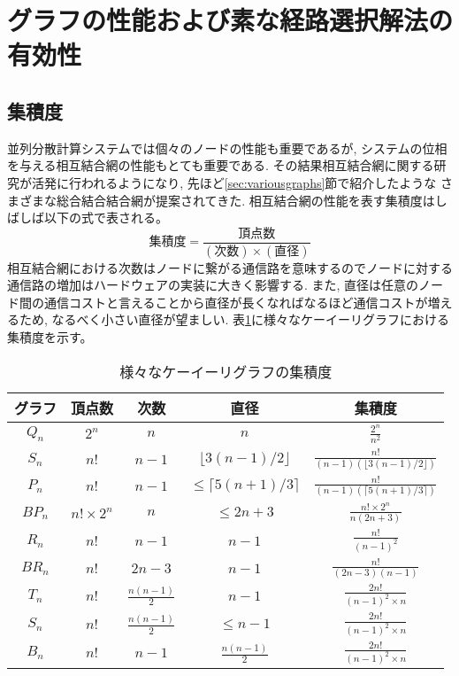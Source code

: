\documentclass[specialreport]{subfiles}
\begin{document}
\section{グラフの性能および素な経路選択解法の有効性}
\subsection{集積度}
並列分散計算システムでは個々のノードの性能も重要であるが, システムの位相を与える相互結合網の性能もとても重要である.
その結果相互結合網に関する研究が活発に行われるようになり, 先ほど\ref{sec:variousgraphs}節で紹介したような
さまざまな総合結合結合網が提案されてきた. 相互結合網の性能を表す集積度はしばしば以下の式で表される。
\[集積度 = \frac{頂点数}{(次数) \times (直径)} \]
相互結合網における次数はノードに繋がる通信路を意味するのでノードに対する通信路の増加はハードウェアの実装に大きく影響する.
また, 直径は任意のノード間の通信コストと言えることから直径が長くなればなるほど通信コストが増えるため, なるべく小さい直径が望ましい.
表\ref{tab:intergrationratio}に様々なケーイーリグラフにおける集積度を示す。
\begin{table}[htb]
  \begin{center}
    \caption{様々なケーイーリグラフの集積度}
    \begin{tabular}{|c|c|c|c|c|} \hline
      グラフ&頂点数&次数&直径&集積度 \\ \hline 
      $Q_n$&$2^n$ & $n$&$n$&$ \frac{2^n}{n^2} $ \\ \hline
      $S_n$&$n!$ & $n-1$&$\lfloor3(n - 1) /2 \rfloor$& $\frac{n! }{(n-1)(\lfloor3(n - 1) /2 \rfloor)}$ \\ \hline
      $P_n$&$n!$ & $n-1$& $ \leq \lceil 5(n + 1) /3 \rceil$ & $\frac{n!}{(n-1)(\lceil 5(n + 1) /3 \rceil)}$\\ \hline  
      $BP_n$&$n!\times 2^{n}$ & $n$& $ \leq  2n + 3 $ & $\frac{n!\times 2^{n}}{n( 2n + 3)}$\\ \hline 
      $R_n$&$n!$ & $n-1$&$n-1$& $ \frac {n!}{(n-1)^2} $\\ \hline
      $BR_n$&$n!$ & $2n-3$&$n-1$& $ \frac {n!}{(2n-3)(n-1)} $\\ \hline
      $T_n$&$n!$ & $\frac{n(n-1)}{2}$&$n-1$& $ \frac {2n!}{(n-1)^2\times n} $\\ \hline
      $S_n$&$n!$ & $\frac{n(n-1)}{2}$&$\leq n-1$& $ \frac {2n!}{(n-1)^2\times n} $\\ \hline
      $B_n$&$n!$ & $n-1$&$\frac{n(n-1)}{2}$& $ \frac {2n!}{(n-1)^2\times n} $\\ \hline
    \end{tabular}
    \label{tab:intergrationratio}
  \end{center}
\end{table}
\end{document}
